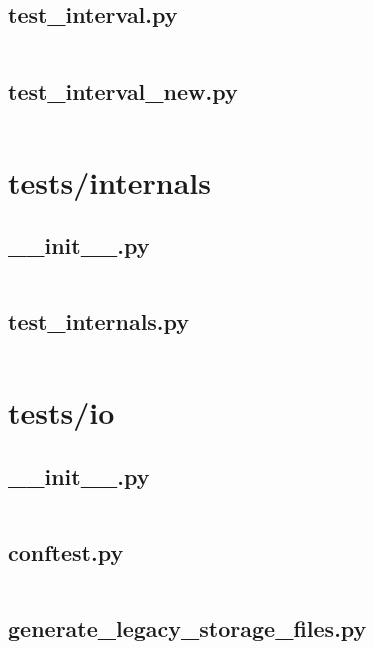 \documentclass{article}
\begin{document}
\subsection{test\_interval.py}
\inputminted{python}{/home/dufferzafar/dev/@clones/pandas/pandas/tests/indexing/interval/test_interval.py}
\newpage

\subsection{test\_interval\_new.py}
\inputminted{python}{/home/dufferzafar/dev/@clones/pandas/pandas/tests/indexing/interval/test_interval_new.py}
\newpage

\section{tests/internals}

\subsection{\_\_init\_\_.py}
\inputminted{python}{/home/dufferzafar/dev/@clones/pandas/pandas/tests/internals/__init__.py}
\newpage

\subsection{test\_internals.py}
\inputminted{python}{/home/dufferzafar/dev/@clones/pandas/pandas/tests/internals/test_internals.py}
\newpage

\section{tests/io}

\subsection{\_\_init\_\_.py}
\inputminted{python}{/home/dufferzafar/dev/@clones/pandas/pandas/tests/io/__init__.py}
\newpage

\subsection{conftest.py}
\inputminted{python}{/home/dufferzafar/dev/@clones/pandas/pandas/tests/io/conftest.py}
\newpage

\subsection{generate\_legacy\_storage\_files.py}
\inputminted{python}{/home/dufferzafar/dev/@clones/pandas/pandas/tests/io/generate_legacy_storage_files.py}
\newpage
\end{document}
